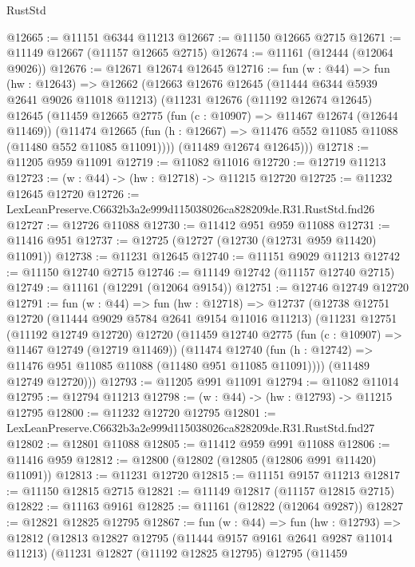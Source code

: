 \begin{lexlean}{RustStd}
\begin{coremodule}
@12665 := @11151 @6344 @11213
@12667 := @11150 @12665 @2715
@12671 := @11149 @12667 (@11157 @12665 @2715)
@12674 := @11161 (@12444 (@12064 @9026))
@12676 := @12671 @12674 @12645
@12716 := fun (w : @44) =>
  fun (hw : @12643) =>
  @12662
    (@12663
      @12676
      @12645
      (@11444 @6344 @5939 @2641 @9026 @11018 @11213)
      (@11231
        @12676
        (@11192 @12674 @12645)
        @12645
        (@11459
          @12665
          @2775
          (fun (c : @10907) => @11467 @12674 (@12644 @11469))
          (@11474
            @12665
            (fun (h : @12667) => @11476 @552 @11085 @11088 (@11480 @552 @11085 @11091))))
        (@11489 @12674 @12645)))
@12718 := @11205 @959 @11091
@12719 := @11082 @11016
@12720 := @12719 @11213
@12723 := (w : @44) -> (hw : @12718) -> @11215 @12720
@12725 := @11232 @12645 @12720
@12726 := LexLeanPreserve.C6632b3a2e999d115038026ca828209de.R31.RustStd.fnd26
@12727 := @12726 @11088
@12730 := @11412 @951 @959 @11088
@12731 := @11416 @951
@12737 := @12725 (@12727 (@12730 (@12731 @959 @11420) @11091))
@12738 := @11231 @12645
@12740 := @11151 @9029 @11213
@12742 := @11150 @12740 @2715
@12746 := @11149 @12742 (@11157 @12740 @2715)
@12749 := @11161 (@12291 (@12064 @9154))
@12751 := @12746 @12749 @12720
@12791 := fun (w : @44) =>
  fun (hw : @12718) =>
  @12737
    (@12738
      @12751
      @12720
      (@11444 @9029 @5784 @2641 @9154 @11016 @11213)
      (@11231
        @12751
        (@11192 @12749 @12720)
        @12720
        (@11459
          @12740
          @2775
          (fun (c : @10907) => @11467 @12749 (@12719 @11469))
          (@11474
            @12740
            (fun (h : @12742) => @11476 @951 @11085 @11088 (@11480 @951 @11085 @11091))))
        (@11489 @12749 @12720)))
@12793 := @11205 @991 @11091
@12794 := @11082 @11014
@12795 := @12794 @11213
@12798 := (w : @44) -> (hw : @12793) -> @11215 @12795
@12800 := @11232 @12720 @12795
@12801 := LexLeanPreserve.C6632b3a2e999d115038026ca828209de.R31.RustStd.fnd27
@12802 := @12801 @11088
@12805 := @11412 @959 @991 @11088
@12806 := @11416 @959
@12812 := @12800 (@12802 (@12805 (@12806 @991 @11420) @11091))
@12813 := @11231 @12720
@12815 := @11151 @9157 @11213
@12817 := @11150 @12815 @2715
@12821 := @11149 @12817 (@11157 @12815 @2715)
@12822 := @11163 @9161
@12825 := @11161 (@12822 (@12064 @9287))
@12827 := @12821 @12825 @12795
@12867 := fun (w : @44) =>
  fun (hw : @12793) =>
  @12812
    (@12813
      @12827
      @12795
      (@11444 @9157 @9161 @2641 @9287 @11014 @11213)
      (@11231
        @12827
        (@11192 @12825 @12795)
        @12795
        (@11459

\end{coremodule}
\end{lexlean}
